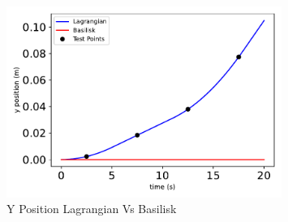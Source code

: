 \begin{figure}[htbp]\centerline{\includegraphics[width=0.8\textwidth]{AutoTeX/YPositionLagrangianVsBasilisk}}\caption{Y Position Lagrangian Vs Basilisk}\label{fig:YPositionLagrangianVsBasilisk}\end{figure}